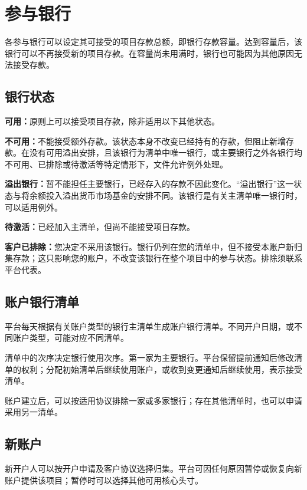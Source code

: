 \documentclass[UTF8,fontset=none,11pt,a4paper]{ctexart}
\begin{document}
\section*{参与银行}
各参与银行可以设定其可接受的项目存款总额，即银行存款容量。达到容量后，该银行可以不再接受新的项目存款。在容量尚未用满时，银行也可能因为其他原因无法\allowbreak\mbox{接受存款。}


\subsection*{银行状态}
\textbf{可用：}原则上可以接受项目存款，除非适用以下\allowbreak\mbox{其他状态。}


\textbf{不可用：}不能接受额外存款。该状态本身不改变已经持有的存款，但阻止新增存款。在没有可用溢出安排，且该银行为清单中唯一银行，或主要银行之外各银行均不可用、已排除或待激活等特定情形下，文件允许\allowbreak\mbox{例外处理。}


\textbf{溢出银行：}暂不能担任主要银行，已经存入的存款不因此变化。“溢出银行”这一状态与将余额投入溢出货币市场基金的安排不同。该银行是有关主清单唯一银行时，可以\allowbreak\mbox{适用例外。}


\textbf{待激活：}已经加入主清单，但尚不能接受\allowbreak\mbox{项目存款。}


\textbf{客户已排除：}您决定不采用该银行。银行仍列在您的清单中，但不接受本账户新归集存款；这只影响您的账户，不改变该银行在整个项目中的参与状态。排除须联系\allowbreak\mbox{平台代表。}


\subsection*{账户银行清单}
平台每天根据有关账户类型的银行主清单生成账户银行清单。不同开户日期，或不同账户类型，可能对应\allowbreak\mbox{不同清单。}


清单中的次序决定银行使用次序。第一家为主要银行。平台保留提前通知后修改清单的权利；分配初始清单后继续使用账户，或收到变更通知后继续使用，表示\allowbreak\mbox{接受清单。}


账户建立后，可以按适用协议排除一家或多家银行；存在其他清单时，也可以申请采用\allowbreak\mbox{另一清单。}


\subsection*{新账户}
新开户人可以按开户申请及客户协议选择归集。平台可因任何原因暂停或恢复向新账户提供该项目；暂停时可以选择其他可用\allowbreak\mbox{核心头寸。}
\end{document}
